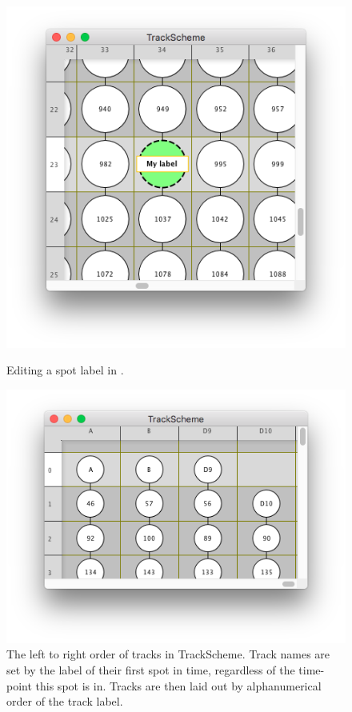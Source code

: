 \begin{figure}
    \begin{minipage}{.35\textwidth}
        \centering
        \includegraphics[height=0.22\textheight,trim=0.5cm .5cm .5cm .5cm,clip]{figures/Mastodon_EditSpotLabel.png}
        \caption{Editing a spot label in \TrackScheme.}
        \label{fig:EditSpotLabel}
    \end{minipage}
    \hfill
    \begin{minipage}{.55\textwidth}
        \centering
        \includegraphics[height=0.25\textheight,trim=0.5cm .5cm .5cm .5cm,clip]{figures/Mastodon_TrackSchemeTrackOrder.png}
        \caption{The left to right order of tracks in TrackScheme. Track names are set by the label of their first spot in time, regardless of the time-point this spot is in. Tracks are then laid out by alphanumerical order of the track label.}
        \label{fig:TrackOrder}
    \end{minipage}
\end{figure}  


